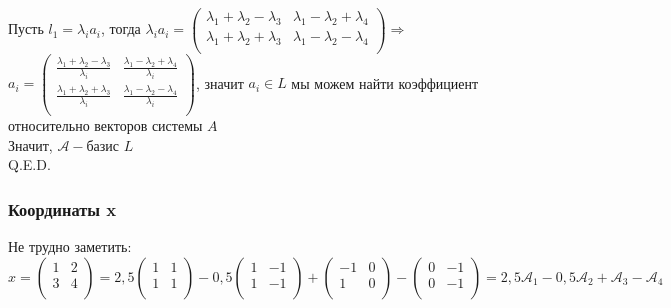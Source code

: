 \documentclass{article}
\begin{document}
    Пусть $l_1 = \lambda_i a_i$, тогда $\lambda_i a_i =
    \begin{pmatrix}
        \lambda_1 + \lambda_2 - \lambda_3 & \lambda_1 - \lambda_2 + \lambda_4 \\
        \lambda_1 + \lambda_2 + \lambda_3 & \lambda_1 - \lambda_2 - \lambda_4 \\
    \end{pmatrix} \Rightarrow
    $
    $a_i = 
    \begin{pmatrix}
        \frac{\lambda_1 + \lambda_2 - \lambda_3}{\lambda_i} & \frac{\lambda_1 - \lambda_2 + \lambda_4}{\lambda_i} \\
        \frac{\lambda_1 + \lambda_2 + \lambda_3}{\lambda_i} & \frac{\lambda_1 - \lambda_2 - \lambda_4}{\lambda_i} \\
    \end{pmatrix}
    $, значит $a_i \in L$ мы можем найти коэффициент относительно векторов системы $A$ \\
    Значит, $\mathcal{A} - \text{базис } L$ \\
    Q.E.D.
    \subsubsection{Координаты x}
    Не трудно заметить: \\
    $x =
    \begin{pmatrix}
        1 & 2 \\
        3 & 4 \\
    \end{pmatrix}
    = 2,5
    \begin{pmatrix}
        1 & 1 \\
        1 & 1 \\
    \end{pmatrix}
    - 0,5
    \begin{pmatrix}
        1 & -1 \\
        1 & -1 \\
    \end{pmatrix}
    +
    \begin{pmatrix}
        -1 & 0 \\
        1 & 0 \\
    \end{pmatrix}
    -
    \begin{pmatrix}
        0 & -1 \\
        0 & -1 \\
    \end{pmatrix}
    = 2,5 \mathcal{A}_1 -0,5 \mathcal{A}_2 + \mathcal{A}_3 - \mathcal{A}_4
    $
\end{document}
